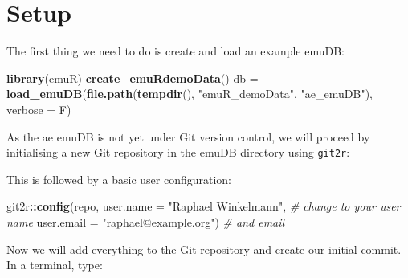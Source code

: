 \documentclass[]{book}
\newenvironment{Shaded}{\begin{snugshade}}{\end{snugshade}}
\newcommand{\CommentTok}[1]{\textcolor[rgb]{0.56,0.35,0.01}{\textit{#1}}}
\newcommand{\DataTypeTok}[1]{\textcolor[rgb]{0.13,0.29,0.53}{#1}}
\newcommand{\KeywordTok}[1]{\textcolor[rgb]{0.13,0.29,0.53}{\textbf{#1}}}
\newcommand{\NormalTok}[1]{#1}
\newcommand{\OperatorTok}[1]{\textcolor[rgb]{0.81,0.36,0.00}{\textbf{#1}}}
\newcommand{\StringTok}[1]{\textcolor[rgb]{0.31,0.60,0.02}{#1}}
\begin{document}
\hypertarget{setup}{%
\section{Setup}\label{setup}}

The first thing we need to do is create and load an example emuDB:

\begin{Shaded}
\begin{Highlighting}[]
\KeywordTok{library}\NormalTok{(emuR)}
\KeywordTok{create_emuRdemoData}\NormalTok{()}
\NormalTok{db =}\StringTok{ }\KeywordTok{load_emuDB}\NormalTok{(}\KeywordTok{file.path}\NormalTok{(}\KeywordTok{tempdir}\NormalTok{(),}
                          \StringTok{"emuR_demoData"}\NormalTok{,}
                          \StringTok{"ae_emuDB"}\NormalTok{),}
                \DataTypeTok{verbose =}\NormalTok{ F)}
\end{Highlighting}
\end{Shaded}

As the ae emuDB is not yet under Git version control, we will proceed by initialising a new Git repository in the emuDB directory using \texttt{git2r}:

\begin{Shaded}
\end{Shaded}

This is followed by a basic user configuration:

\begin{Shaded}
\begin{Highlighting}[]
\NormalTok{git2r}\OperatorTok{::}\KeywordTok{config}\NormalTok{(repo, }
              \DataTypeTok{user.name =} \StringTok{"Raphael Winkelmann"}\NormalTok{, }\CommentTok{# change to your user name}
              \DataTypeTok{user.email =} \StringTok{"raphael@example.org"}\NormalTok{) }\CommentTok{# and email}
\end{Highlighting}
\end{Shaded}

Now we will add everything to the Git repository and create our initial commit. In a terminal, type:

\begin{Shaded}
\end{Shaded}
\end{document}
